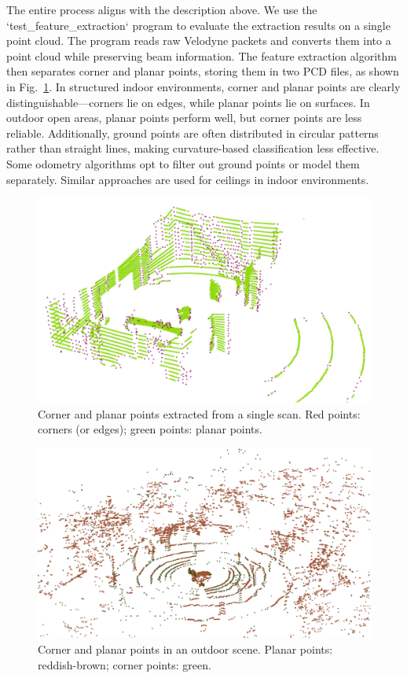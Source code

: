 The entire process aligns with the description above. We use the `test_feature_extraction` program to evaluate the extraction results on a single point cloud. The program reads raw Velodyne packets and converts them into a point cloud while preserving beam information. The feature extraction algorithm then separates corner and planar points, storing them in two PCD files, as shown in Fig.~\ref{fig:corner-and-edge}. In structured indoor environments, corner and planar points are clearly distinguishable—corners lie on edges, while planar points lie on surfaces. In outdoor open areas, planar points perform well, but corner points are less reliable. Additionally, ground points are often distributed in circular patterns rather than straight lines, making curvature-based classification less effective. Some odometry algorithms opt to filter out ground points or model them separately. Similar approaches are used for ceilings in indoor environments.  

\begin{figure}[!thp]  
	\centering  
	\includegraphics[width=.8\textwidth]{resources/3d-lidar-mapping/corner_and_edge}  
	\caption{Corner and planar points extracted from a single scan. Red points: corners (or edges); green points: planar points.}  
	\label{fig:corner-and-edge}  
\end{figure}  

\begin{figure}[!thp]  
	\centering  
	\includegraphics[width=.8\textwidth]{resources/3d-lidar-mapping/corner-and-edge-outside}  
	\caption{Corner and planar points in an outdoor scene. Planar points: reddish-brown; corner points: green.}  
	\label{fig:corner-and-edge-outside}  
\end{figure}  

